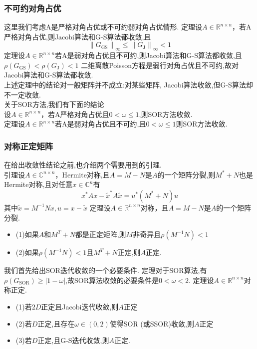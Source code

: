 \documentclass[12pt,a4paper]{article}
\begin{document}
\subsubsection{不可约对角占优}
这里我们考虑A是严格对角占优或不可约弱对角占优情形.
{\color{blue}定理}\quad 设$A \in \mathbb{R}^{n \times n}$，若A严格对角占优,则Jacobi算法和G-S算法都收敛,且
$$
\left\|G_{\mathrm{GS}}\right\|_{\infty} \leq\left\|G_{\mathrm{J}}\right\|_{\infty}<1
$$
{\color{blue}定理}\quad 设$A \in \mathbb{R}^{n \times n}$若A是弱对角占优且不可约,则Jacobi算法和G-S算法都收敛,且$\rho\left(G_{\mathrm{GS}}\right)<\rho\left(G_{\mathrm{J}}\right)<1$
二维离散Poisson方程是弱行对角占优且不可约,故对Jacobi算法和G-S算法都收敛.\\
上述定理中的结论对一般矩阵并不成立:{\color{blue}对某些矩阵, Jacobi算法收敛,但G-S算法却不一定收敛}.\\
关于SOR方法,我们有下面的结论\\
设$A \in \mathbb{R}^{n \times n}$，若A严格对角占优且$0<\omega \leq 1$,则SOR方法收敛.\\
{\color{blue}定理}\quad 设$A \in \mathbb{R}^{n \times n}$若A是弱对角占优且不可约,且$0<\omega \leq 1$则SOR方法收敛.
\subsubsection{对称正定矩阵}
在给出收敛性结论之前,也介绍两个需要用到的引理.\\
{\color{blue}引理}\quad 设$A \in \mathbb{C}^{n \times n}$，Hermite对称,且$A=M-N$是$A$的一个矩阵分裂,则$M^{*}+N$也是Hermite对称,且对任意$x \in \mathbb{C}^{n}$有
$$
x^{*} A x-\tilde{x}^{*} A \tilde{x}=u^{*}\left(M^{*}+N\right) u
$$
其中$\tilde{x}=M^{-1} N x, u=x-\tilde{x}$
{\color{blue}定理}\quad 设$A \in \mathbb{R}^{n \times n}$对称，且$A=M-N$是$A$的一个矩阵分裂.
\begin{itemize}
\item (1)如果$A$和$M^{T}+N$都是正定矩阵,则$M$非奇异且$\rho\left(M^{-1} N\right)<1$
\item (2)如果$\rho\left(M^{-1} N\right)<1$且$M^{T}+N$正定,则$A$正定.
\end{itemize}
我们首先给出SOR迭代收敛的一个必要条件.
{\color{blue}定理}对于SOR算法,有$\rho\left(G_{\mathrm{SOR}}\right) \geq|1-\omega|$,故SOR算法收敛的必要条件是$0<\omega<2$.
{\color{blue}定理}\quad 设$A \in \mathbb{R}^{n \times n}$对称正定.
\begin{itemize}
\item (1)若$2D$正定且Jacobi迭代收敛,则$A$正定
\item (2)若$D$正定,且存在$\omega \in(0,2)$使得SOR (或SSOR)收敛,则$A$正定
\item (3)若$D$正定,且G-S迭代收敛,则$A$正定.
\end{itemize}
\end{document}
